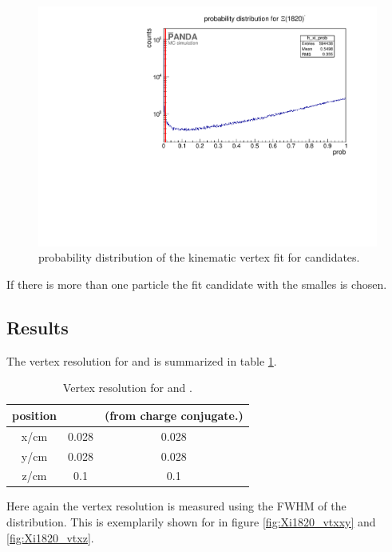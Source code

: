 		\begin{figure}
			\centering
			\includegraphics[width=1.\textwidth]{./plots/Xi1820/XiMinus1820_prob.pdf}
			\caption{\propose probability distribution of the kinematic vertex fit for \excitedcascade candidates.}
			\label{fig:xi1820_prob}
		\end{figure}
		
		If there is more than one particle the fit candidate with the smalles \chisq is chosen.
		
	\subsection*{Results}
	The vertex resolution for \excitedcascade and \excitedanticascade is summarized in table \ref{tab:Xi1820_vtxres}.
	
	\begin{table}
		\centering
		\caption{\propose Vertex resolution for \excitedcascade and \excitedanticascade.}
		\label{tab:Xi1820_vtxres}
		\begin{tabular}{ccc}
			\hline
			position & \excitedcascade & \excitedanticascade (from charge conjugate.) \\
			\hline
			\hline
			x/cm & 0.028 & 0.028\\
			y/cm & 0.028 & 0.028\\
			z/cm & 0.1 & 0.1\\
			\hline
			 
		\end{tabular}
	\end{table}
	
	Here again the vertex resolution is measured using the FWHM of the distribution. 
	This is exemplarily shown for \excitedcascade in figure \ref{fig:Xi1820_vtxxy} and \ref{fig:Xi1820_vtxz}.
	
